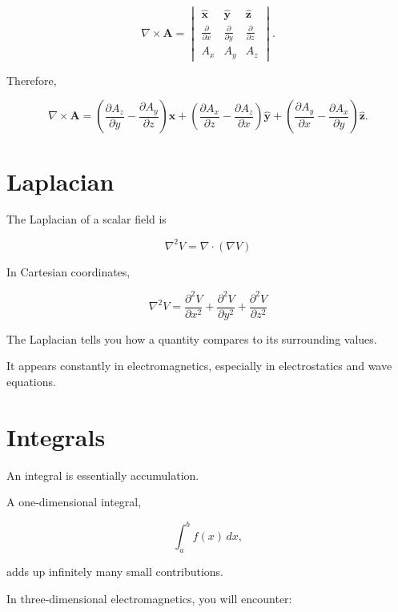 \documentclass[11pt]{article}
\newcommand{\vect}[1]{\mathbf{#1}}
\newcommand{\uvect}[1]{\hat{\mathbf{#1}}}
\begin{document}
\[
\nabla\times\vect{A}
=
\begin{vmatrix}
\uvect{x} & \uvect{y} & \uvect{z}\\
\frac{\partial}{\partial x}
&
\frac{\partial}{\partial y}
&
\frac{\partial}{\partial z}
\\
A_x&A_y&A_z
\end{vmatrix}.
\]

Therefore,

\[
\nabla\times\vect{A}
=
\left(
\frac{\partial A_z}{\partial y}
-
\frac{\partial A_y}{\partial z}
\right)\uvect{x}
+
\left(
\frac{\partial A_x}{\partial z}
-
\frac{\partial A_z}{\partial x}
\right)\uvect{y}
+
\left(
\frac{\partial A_y}{\partial x}
-
\frac{\partial A_x}{\partial y}
\right)\uvect{z}.
\]



\section{Laplacian}

The Laplacian of a scalar field is

\[
\boxed{
\nabla^2V
=
\nabla\cdot(\nabla V)
}
\]

In Cartesian coordinates,

\[
\boxed{
\nabla^2V
=
\frac{\partial^2V}{\partial x^2}
+
\frac{\partial^2V}{\partial y^2}
+
\frac{\partial^2V}{\partial z^2}
}
\]

The Laplacian tells you how a quantity compares to its surrounding values.

It appears constantly in electromagnetics, especially in electrostatics and wave equations.



\section{Integrals}

An integral is essentially accumulation.

A one-dimensional integral,

\[
\int_a^b f(x)\,dx,
\]

adds up infinitely many small contributions.

In three-dimensional electromagnetics, you will encounter:
\end{document}
